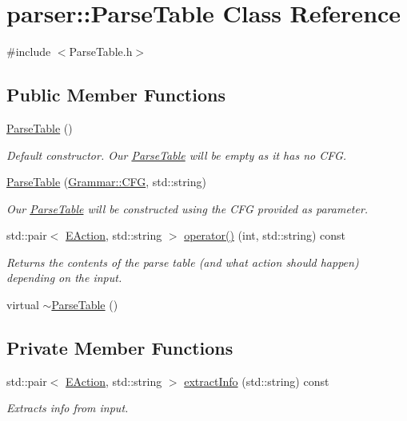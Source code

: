 \hypertarget{classparser_1_1ParseTable}{\section{parser\-:\-:\-Parse\-Table \-Class \-Reference}
\label{d6/d64/classparser_1_1ParseTable}
}


{\ttfamily \#include $<$\-Parse\-Table.\-h$>$}

\subsection*{\-Public \-Member \-Functions}
\begin{DoxyCompactItemize}
\item 
\hyperlink{classparser_1_1ParseTable_a00ed64dc142ed6ff9418bec52ae3db04}{\-Parse\-Table} ()
\begin{DoxyCompactList}\small\item\em \-Default constructor. \-Our \hyperlink{classparser_1_1ParseTable}{\-Parse\-Table} will be empty as it has no \-C\-F\-G. \end{DoxyCompactList}\item 
\hyperlink{classparser_1_1ParseTable_a4cab1aeb721c0375dbf426ee2200dee4}{\-Parse\-Table} (\hyperlink{classGrammar_1_1CFG}{\-Grammar\-::\-C\-F\-G}, std\-::string)
\begin{DoxyCompactList}\small\item\em \-Our \hyperlink{classparser_1_1ParseTable}{\-Parse\-Table} will be constructed using the \-C\-F\-G provided as parameter. \end{DoxyCompactList}\item 
std\-::pair$<$ \hyperlink{namespaceparser_a7a838229f5b5b20f185dfad9d362dbed}{\-E\-Action}, std\-::string $>$ \hyperlink{classparser_1_1ParseTable_a26500ede234e76d28fcc6bef9198b71a}{operator()} (int, std\-::string) const 
\begin{DoxyCompactList}\small\item\em \-Returns the contents of the parse table (and what action should happen) depending on the input. \end{DoxyCompactList}\item 
virtual \hyperlink{classparser_1_1ParseTable_a9879c15d87bea61cdfbf3e58151e57d3}{$\sim$\-Parse\-Table} ()
\end{DoxyCompactItemize}
\subsection*{\-Private \-Member \-Functions}
\begin{DoxyCompactItemize}
\item 
std\-::pair$<$ \hyperlink{namespaceparser_a7a838229f5b5b20f185dfad9d362dbed}{\-E\-Action}, std\-::string $>$ \hyperlink{classparser_1_1ParseTable_aa82b236a735f2f0b9aff02273c9c96a8}{extract\-Info} (std\-::string) const 
\begin{DoxyCompactList}\small\item\em \-Extracts info from input. \end{DoxyCompactList}\end{DoxyCompactItemize}
